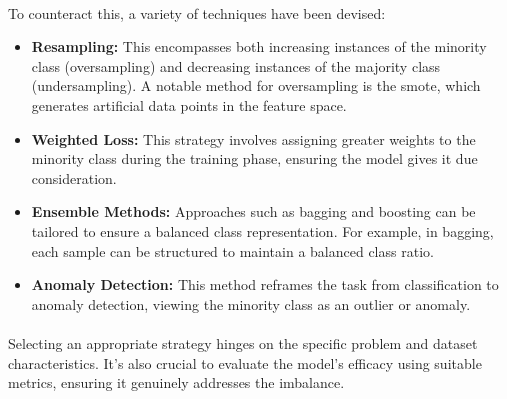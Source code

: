         \paragraph{}To counteract this, a variety of techniques have been devised:
        \begin{itemize}
            \item \textbf{Resampling:} This encompasses both increasing instances of the minority class (oversampling) and decreasing instances of the majority class (undersampling). A notable method for oversampling is the \acrfull{smote}, which generates artificial data points in the feature space.
            \item \textbf{Weighted Loss:} This strategy involves assigning greater weights to the minority class during the training phase, ensuring the model gives it due consideration.
            \item \textbf{Ensemble Methods:} Approaches such as bagging and boosting can be tailored to ensure a balanced class representation. For example, in bagging, each sample can be structured to maintain a balanced class ratio.
            \item \textbf{Anomaly Detection:} This method reframes the task from classification to anomaly detection, viewing the minority class as an outlier or anomaly.
        \end{itemize}
        \paragraph{}Selecting an appropriate strategy hinges on the specific problem and dataset characteristics. It's also crucial to evaluate the model's efficacy using suitable metrics, ensuring it genuinely addresses the imbalance.

